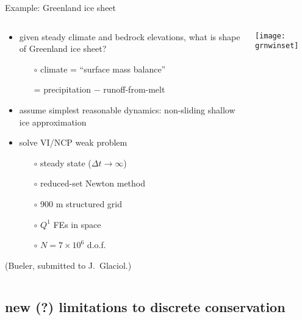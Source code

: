 \documentclass{beamer}
\begin{document}
\begin{frame}{Example: Greenland ice sheet}

\begin{columns}
\begin{column}{0.6\textwidth}
\begin{itemize}
\small
\item given steady climate and bedrock elevations, what is shape of Greenland ice sheet?
  \begin{itemize}
  \scriptsize
  \item[$\circ$] climate = ``surface mass balance''
  \item[] \qquad = precipitation $-$ runoff-from-melt
  \end{itemize}
\small
\item assume simplest reasonable dynamics: non-sliding shallow ice approximation
\item solve VI/NCP weak problem
  \begin{itemize}
  \scriptsize
  \item[$\circ$] steady state ($\Delta t\to \infty$)
  \item[$\circ$] reduced-set Newton method
  \item[$\circ$] 900 m structured grid
  \item[$\circ$] $Q^1$ FEs in space
  \item[$\circ$] $N=7\times 10^6$ d.o.f.
  \end{itemize}
\end{itemize}

\vspace{5mm}
\tiny (Bueler, submitted to J.~Glaciol.)
\end{column}
\begin{column}{0.4\textwidth}
\vspace{-5mm}

\begin{center}
\texttt{[image: grnwinset]}
\end{center}
\end{column}
\end{columns}
\end{frame}


\subsection{new (?) limitations to discrete conservation}
\end{document}
